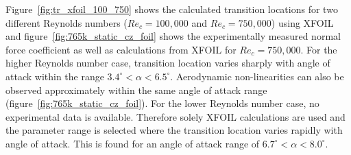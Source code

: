 Figure~\ref{fig:tr_xfoil_100_750} shows the calculated transition locations for two different Reynolds numbers ($Re_{c}=100,000$ and $Re_{c}=750,000$) using XFOIL and figure~\ref{fig:765k_static_cz_foil} shows the experimentally measured normal force coefficient as well as calculations from XFOIL for $Re_{c}=750,000$. For the higher Reynolds number case, transition location varies sharply with angle of attack within the range $3.4^{\circ}<\alpha<6.5^{\circ}$. Aerodynamic non-linearities can also be observed approximately within the same angle of attack range (figure~\ref{fig:765k_static_cz_foil}). For the lower Reynolds number case, no experimental data is available. Therefore solely XFOIL calculations are used and the parameter range is selected where the transition location varies rapidly with angle of attack. This is found for an angle of attack range of $6.7^{\circ}<\alpha<8.0^{\circ}$.

